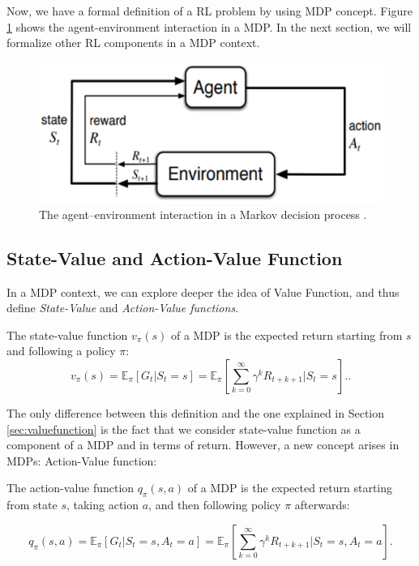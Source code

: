 Now, we have a formal definition of a RL problem by using MDP concept. Figure \ref{fig:mdprlsystem} shows the agent-environment interaction in a MDP. In the next section, we will formalize other RL components in a MDP context.

\begin{figure}[ht!]
	\centering
	\includegraphics[scale=0.5]{Cap4/mdprlsystem.eps}
	\caption{The agent–environment interaction in a Markov decision process \cite{sutton1998rli}.}
	\label{fig:mdprlsystem}
\end{figure}

\subsection{State-Value and Action-Value Function}

In a MDP context, we can explore deeper the idea of Value Function, and thus define \textit{State-Value} and \textit{Action-Value functions}.

\begin{definition}\label{def:statevalue}
	The state-value function $v_{\pi}(s)$ of a MDP is the expected return starting from $s$ and following a policy $\pi$:
	\begin{equation}
	v_{\pi}(s) = \mathbb{E}_{\pi} [G_{t} \big| S_{t} = s] = \mathbb{E}_{\pi} \left[ \sum_{k = 0}^{\infty} \gamma^{k} R_{t + k + 1} \Bigg| S_{t} = s \right]  ..
	\end{equation}
\end{definition}

The only difference between this definition and the one explained in Section \ref{sec:valuefunction} is the fact that we consider state-value function as a component of a MDP and in terms of return. However, a new concept arises in MDPs: Action-Value function:

\begin{definition}\label{def:actionvalue}
	The action-value function $q_{\pi}(s,a)$ of a MDP is the expected return starting from state $s$, taking action $a$, and then following policy $\pi$ afterwards:
	
	\begin{equation}
	q_{\pi}(s,a) = \mathbb{E}_{\pi} [G_{t} | S_{t} = s, A_{t} = a] = \mathbb{E}_{\pi} \left[ \sum_{k = 0}^{\infty} \gamma^{k} R_{t + k + 1} \Bigg| S_{t} = s, A_{t} = a \right]. 
	\end{equation}
\end{definition}

